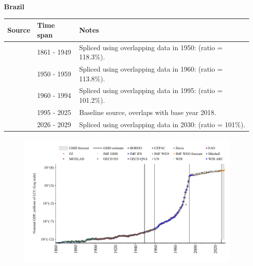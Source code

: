 \documentclass[12pt,a4paper,landscape]{article}
\begin{document}
\begin{adjustbox}{max totalsize={\paperwidth}{\paperheight},center}
\begin{minipage}[t][\textheight][t]{\textwidth}
\vspace*{0.5cm}
{}
\begin{center}
{\Large\bfseries Brazil}
\end{center}
\vspace{0.5cm}
\begin{table}[H]
\centering
\small
\begin{tabular}{|l|l|l|}
\hline
\textbf{Source} & \textbf{Time span} & \textbf{Notes} \\
\hline
\rowcolor{white}\cite{Mitchell}& 1861 - 1949 &Spliced using overlapping data in 1950: (ratio = 118.3\%).\\
\rowcolor{lightgray}\cite{IMF_GDD}& 1950 - 1959 &Spliced using overlapping data in 1960: (ratio = 113.8\%).\\
\rowcolor{white}\cite{WDI}& 1960 - 1994 &Spliced using overlapping data in 1995: (ratio = 101.2\%).\\
\rowcolor{lightgray}\cite{OECD_EO}& 1995 - 2025 &Baseline source, overlaps with base year 2018.\\
\rowcolor{white}\cite{IMF_WEO_forecast}& 2026 - 2029 &Spliced using overlapping data in 2030: (ratio = 101\%).\\
\hline
\end{tabular}
\end{table}
\begin{figure}[H]
\centering
\includegraphics[width=\textwidth,height=0.6\textheight,keepaspectratio]{graphs/BRA_nGDP.pdf}
\end{figure}
\end{minipage}
\end{adjustbox}
\end{document}

